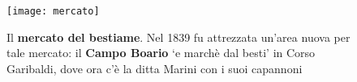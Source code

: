  \begin{figure}[htb]
    \centering
    \vspace{1cm}
    \texttt{[image: mercato]}
    \caption[Mercato del Bestiame]{Il \textbf{mercato del bestiame}. Nel 1839 fu attrezzata un'area nuova per tale mercato: il \textbf{Campo Boario} `e marchè dal besti' in Corso Garibaldi, dove ora c'è la ditta Marini con i suoi capannoni\label{fig:mercato}}
\end{figure}











%
